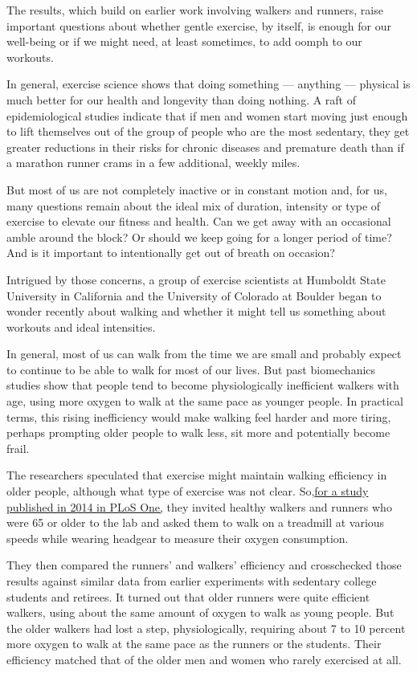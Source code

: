The results, which build on earlier work involving walkers and runners,
raise important questions about whether gentle exercise, by itself, is
enough for our well-being or if we might need, at least sometimes, to
add oomph to our workouts.

In general, exercise science shows that doing something --- anything ---
physical is much better for our health and longevity than doing nothing.
A raft of epidemiological studies indicate that if men and women start
moving just enough to lift themselves out of the group of people who are
the most sedentary, they get greater reductions in their risks for
chronic diseases and premature death than if a marathon runner crams in
a few additional, weekly miles.

But most of us are not completely inactive or in constant motion and,
for us, many questions remain about the ideal mix of duration, intensity
or type of exercise to elevate our fitness and health. Can we get away
with an occasional amble around the block? Or should we keep going for a
longer period of time? And is it important to intentionally get out of
breath on occasion?

Intrigued by those concerns, a group of exercise scientists at Humboldt
State University in California and the University of Colorado at Boulder
began to wonder recently about walking and whether it might tell us
something about workouts and ideal intensities.

In general, most of us can walk from the time we are small and probably
expect to continue to be able to walk for most of our lives. But past
biomechanics studies show that people tend to become physiologically
inefficient walkers with age, using more oxygen to walk at the same pace
as younger people. In practical terms, this rising inefficiency would
make walking feel harder and more tiring, perhaps prompting older people
to walk less, sit more and potentially become frail.

The researchers speculated that exercise might maintain walking
efficiency in older people, although what type of exercise was not
clear.
So,\href{https://journals.plos.org/plosone/article?id=10.1371/journal.pone.0113471}{for
a study published in 2014 in PLoS One,} they invited healthy walkers and
runners who were 65 or older to the lab and asked them to walk on a
treadmill at various speeds while wearing headgear to measure their
oxygen consumption.

They then compared the runners' and walkers' efficiency and crosschecked
those results against similar data from earlier experiments with
sedentary college students and retirees. It turned out that older
runners were quite efficient walkers, using about the same amount of
oxygen to walk as young people. But the older walkers had lost a step,
physiologically, requiring about 7 to 10 percent more oxygen to walk at
the same pace as the runners or the students. Their efficiency matched
that of the older men and women who rarely exercised at all.

